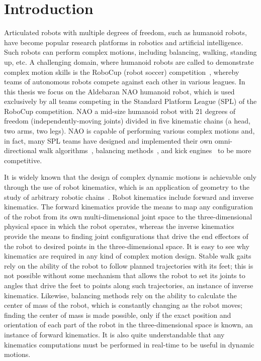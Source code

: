 \chapter{Introduction}
\label{intro}

Articulated robots with multiple degrees of freedom, such as humanoid robots, have become popular research platforms in robotics and artificial intelligence. Such robots can perform complex motions, including balancing, walking, standing up, etc. A challenging domain, where humanoid robots are called to demonstrate complex motion skills is the RoboCup (robot soccer) competition~\cite{robocup}, whereby teams of autonomous robots compete against each other in various leagues. In this thesis we focus on the Aldebaran NAO humanoid robot, which is used exclusively by all teams competing in the Standard Platform League (SPL) of the RoboCup competition. NAO a mid-size humanoid robot with 21 degrees of freedom (independently-moving joints) divided in five kinematic chains (a head, two arms, two legs). NAO is capable of performing various complex motions and, in fact, many SPL teams have designed and implemented their own omni-directional walk algorithms~\cite{naowalk,bhumanwalk}, balancing methods~\cite{somebalancepaper}, and kick engines~\cite{bhumankickengine} to be more competitive. 

It is widely known that the design of complex dynamic motions is achievable only through the use of robot kinematics, which is an application of geometry to the study of arbitrary robotic chains~\cite{introroboticscraigbook}. Robot kinematics include forward and inverse kinematics. The forward kinematics provide the means to map any configuration of the robot from its own multi-dimensional joint space to the three-dimensional physical space in which the robot operates, whereas the inverse kinematics provide the means to finding joint configurations that drive the end effectors of the robot to desired points in the three-dimensional space. It is easy to see why kinematics are required in any kind of complex motion design. Stable walk gaits rely on the ability of the robot to follow planned trajectories with its feet; this is not possible without some mechanism that allows the robot to set its joints to angles that drive the feet to points along such trajectories, an instance of inverse kinematics. Likewise, balancing methods rely on the ability to calculate the center of mass of the robot, which is constantly changing as the robot moves; finding the center of mass is made possible, only if the exact position and orientation of each part of the robot in the three-dimensional space is known, an instance of forward kinematics. It is also quite understandable that any kinematics computations must be performed in real-time to be useful in dynamic motions. 



